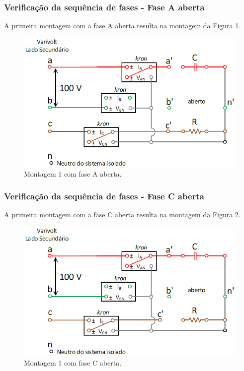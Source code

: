 \documentclass[a4paper,12pt,oneside,openany,table,xcdraw]{article}
\begin{document}
\newpage
\subsubsection{Verificação da sequência de fases - Fase A aberta}
A primeira montagem com a fase A aberta resulta na montagem da Figura \ref{m2:esquema}.
\vspace{0.3cm}
\begin{figure}[H]
\centering
\includegraphics[width=13cm]{m2-circuito}
\caption{Montagem 1 com fase A aberta.}
\label{m2:esquema}
\end{figure}
\vspace{0.1cm}

\subsubsection{Verificação da sequência de fases - Fase C aberta}
A primeira montagem com a fase C aberta resulta na montagem da Figura \ref{m3:esquema}.
\vspace{0.3cm}
\begin{figure}[H]
\centering
\includegraphics[width=13cm]{m3-circuito}
\caption{Montagem 1 com fase C aberta.}
\label{m3:esquema}
\end{figure}
\vspace{0.1cm}
\end{document}
